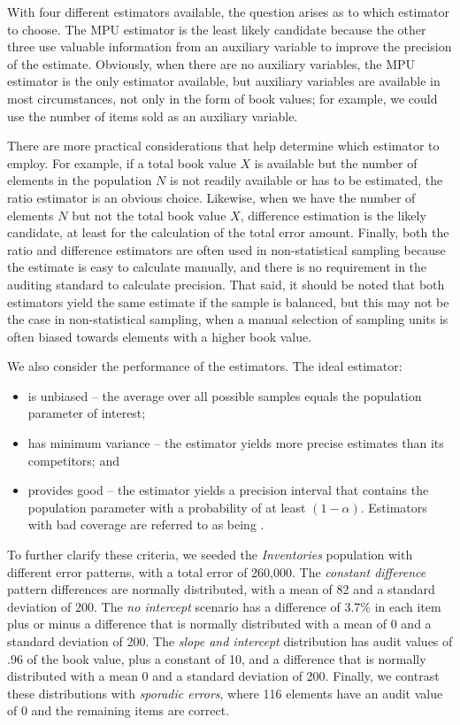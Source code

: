 With four different estimators available, the question arises as to which estimator to choose. The MPU estimator is the least likely candidate because the other three use valuable information from an auxiliary variable to improve the precision of the estimate. Obviously, when there are no auxiliary variables, the MPU estimator is the only estimator available, but auxiliary variables are available in most circumstances, not only in the form of book values; for example, we could use the number of items sold as an auxiliary variable.

There are more practical considerations that help determine which estimator to employ. For example, if a total book value $X$ is available but the number of elements in the population $N$ is not readily available or has to be estimated, the ratio estimator is an obvious choice. Likewise, when we have the number of elements $N$ but not the total book value $X$, difference estimation is the likely candidate, at least for the calculation of the total error amount. Finally, both the ratio and difference estimators are often used in non-statistical sampling because the estimate is easy to calculate manually, and there is no requirement in the auditing standard to calculate precision. That said, it should be noted that both estimators yield the same estimate if the sample is balanced, but this may not be the case in non-statistical sampling, when a manual selection of sampling units is often biased towards elements with a higher book value.

We also consider the performance of the estimators. The ideal estimator: 

\begin{itemize}
\item is unbiased -- the average over all possible samples equals the population parameter of interest;
\item has minimum variance -- the estimator yields more precise estimates than its competitors; and
\item provides good  -- the estimator yields a precision interval that contains the population parameter with a probability of at least $(1 - \alpha)$. Estimators with bad coverage are referred to as being .
\end{itemize}

\bigskip
To further clarify these criteria, we seeded the \emph{Inventories} population with different error patterns, with a total error of 260,000. The \emph{constant difference} pattern differences are normally distributed, with a mean of 82 and a standard deviation of 200. The \emph{no intercept} scenario has a difference of 3.7\% in each item plus or minus a difference that is normally distributed with a mean of 0 and a standard deviation of 200. The \emph{slope and intercept} distribution has audit values of .96 of the book value, plus a constant of 10, and a difference that is normally distributed with a mean 0 and a standard deviation of 200. Finally, we contrast these distributions with \emph{sporadic errors}, where 116 elements have an audit value of 0 and the remaining items are correct. 

